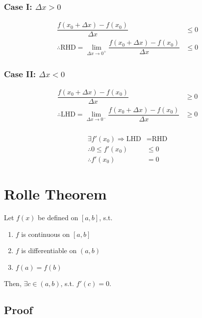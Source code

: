 \documentclass[fleqn]{article}
\begin{document}
\subsubsection*{Case I: $\Delta x > 0$}

\begin{align*}
	\dfrac{f(x_0 + \Delta x) - f(x_0)}{\Delta x} &\leq 0 \\
	\therefore \text{RHD} = \lim\limits_{\Delta x \rightarrow 0^+} \dfrac{f(x_0 + \Delta x) - f(x_0)}{\Delta x} &\leq 0
\end{align*}

\subsubsection*{Case II: $\Delta x < 0$}

\begin{align*}
\dfrac{f(x_0 + \Delta x) - f(x_0)}{\Delta x} &\geq 0 \\
\therefore \text{LHD} = \lim\limits_{\Delta x \rightarrow 0^-} \dfrac{f(x_0 + \Delta x) - f(x_0)}{\Delta x} &\geq 0
\end{align*}

\subsubsection*{}

\begin{align*}
	\exists f'(x_0) \Rightarrow \text{LHD} &= \text{RHD} \\
	\therefore 0 \leq f'(x_0) &\leq 0 \\
	\therefore f'(x_0) &= 0
\end{align*}

\section{Rolle Theorem}

Let $f(x)$ be defined on $[a, b]$, s.t. 
\begin{enumerate}[(1)]
	\item $f$ is continuous on $[a, b]$ \label{Rolle condition 1}
	\item $f$ is differentiable on $(a, b)$ \label{Rolle condition 2}
	\item $f(a) = f(b)$ \label{Rolle condition 3}
\end{enumerate}
Then, $\exists c \in (a, b)$, s.t. $f'(c) = 0$.

\subsection{Proof}
\end{document}
